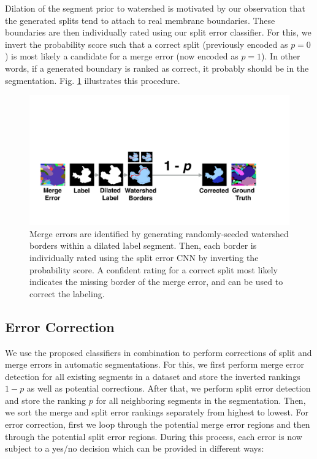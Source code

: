 Dilation of the segment prior to watershed is motivated by our observation that the generated splits tend to attach to real membrane boundaries. These boundaries are then individually rated using our split error classifier. For this, we invert the probability score such that a correct split (previously encoded as $p=0$) is most likely a candidate for a merge error (now encoded as $p=1$). In other words, if a generated boundary is ranked as correct, it probably should be in the segmentation. Fig. \ref{fig:merge_error} illustrates this procedure.

\begin{figure}[t]
\begin{center}
  \includegraphics[width=\linewidth]{gfx/merge_error.pdf}
\end{center}
   \caption{Merge errors are identified by generating randomly-seeded watershed borders within a dilated label segment. Then, each border is individually rated using the split error CNN by inverting the probability score. A confident rating for a correct split most likely indicates the missing border of the merge error, and can be used to correct the labeling.}
\label{fig:merge_error}
\end{figure}

\subsection{Error Correction}
\label{sec:errorcorrection}

We use the proposed classifiers in combination to perform corrections of split and merge errors in automatic segmentations. For this, we first perform merge error detection for all existing segments in a dataset and store the inverted rankings $1-p$ as well as potential corrections. After that, we perform split error detection and store the ranking $p$ for all neighboring segments in the segmentation. Then, we sort the merge and split error rankings separately from highest to lowest. For error correction, first we loop through the potential merge error regions and then through the potential split error regions. During this process, each error is now subject to a yes/no decision which can be provided in different ways:

